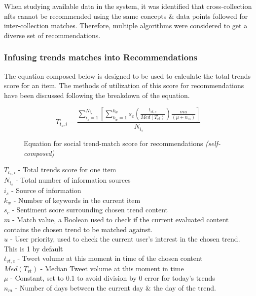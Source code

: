 When studying available data in the system, it was identified that cross-collection \gls{nft}s cannot be recommended using the same concepts \& data points followed for inter-collection matches. Therefore, multiple algorithms were considered to get a diverse set of recommendations.

\subsubsection{Infusing trends matches into Recommendations}
The equation composed below is designed to be used to calculate the total trends score for an item. The methods of utilization of this score for recommendations have been discussed following the breakdown of the equation.

\begin{figure}[h!]
\begin{equation}
T_{t_{s},i} = \frac{\sum^{N_{i_{s}}}_{i_{s}=1} \left[\sum^{k_{w}}_{k_{w}=1} s_{c} \left(\frac{t_{vt,c}}{Med(T_{vt})}\right) \frac{m u}{\left(\mu + n_{m}\right)} \right]}{N_{i_{s}}}
\end{equation}
\caption*{Equation for social trend-match score for recommendations \textit{(self-composed)}}
\end{figure}

\noindent$T_{t_{s},i}$ - Total trends score for one item\\
$N_{i_{s}}$ - Total number of information sources\\
$i_{s}$ - Source of information\\
$k_{w}$ - Number of keywords in the current item\\
$s_{c}$ - Sentiment score surrounding chosen trend content\\
$m$ - Match value, a Boolean used to check if the current evaluated content contains the chosen trend to be matched against. \\
$u$ - User priority, used to check the current user's interest in the chosen trend. This is 1 by default\\
$t_{vt,c}$ - Tweet volume at this moment in time of the chosen content \\
$Med(T_{vt})$ - Median Tweet volume at this moment in time\\
$\mu$ - Constant, set to 0.1 to avoid division by 0 error for today's trends\\
$n_{m}$ - Number of days between the current day \& the day of the trend.\\

